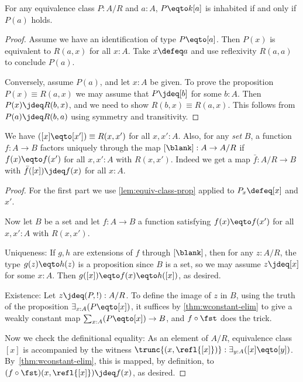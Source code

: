 \begin{lemma}\label{lem:equiv-class-prop}
  For any equivalence class $P : A/R$ and $a:A$,
  $P \eqto k[a]$ is inhabited if and only if $P(a)$ holds.
\end{lemma}
\begin{proof}
  Assume we have an identification of type $P \eqto [a]$. Then $P(x)$ is equivalent to $R(a,x)$ for all $x:A$.
  Take $x\defeq a$ and use reflexivity $R(a,a)$ to conclude $P(a)$.

  Conversely, assume $P(a)$, and let $x:A$ be given.
  To prove the proposition $P(x) \equiv R(a,x)$ we may assume that
  $P \jdeq [b]$ for some $b:A$.
  Then $P(x) \jdeq R(b,x)$, and we need to show $R(b,x) \equiv R(a,x)$.
  This follows from $P(a) \jdeq R(b,a)$ using symmetry and transitivity.
\end{proof}
\begin{theorem}\label{thm:quotient-property}
  We have $([x] \eqto [x']) \equiv R(x,x')$ for all $x,x':A$.
  Also, for any \emph{set} $B$, a
  function $f : A \to B$ factors uniquely through the map $[\blank] : A \to A/R$ if
  $f(x) \eqto f(x')$ for all $x,x':A$ with $R(x,x')$.
  Indeed we get a map $\bar f : A/R \to B$ with
  $\bar f([x]) \jdeq f(x)$ for all $x:A$.
\end{theorem}
\begin{proof}
  For the first part we use \cref{lem:equiv-class-prop} applied to $P_x \defeq [x]$ and $x'$.

  Now let $B$ be a set and let $f : A \to B$ a function satisfying $f(x) \eqto f(x')$
  for all $x,x':A$ with $R(x,x')$.

  Uniqueness: If $g,h$ are extensions of $f$ through $[\blank]$, then
  for any $z:A/R$, the type $g(z) \eqto h(z)$ is a proposition since $B$ is
  a set, so we may assume $z\jdeq [x]$ for some $x:A$. Then
  $g([x]) \eqto f(x) \eqto h([x])$, as desired.

  Existence: Let $z\jdeq(P,!):A/R$. To define the image of $z$ in $B$,
  using the truth of the proposition $\exists_{x:A}(P \eqto [x])$,
  it suffices by \cref{thm:wconstant-elim}
  to give a weakly constant map $\sum_{x:A}(P \eqto [x]) \to B$,
  and $f \circ \fst$ does the trick.

  Now we check the definitional equality: As an element of $A/R$,
  equivalence class $[x]$ is accompanied by the witness
  $\trunc{(x, \refl{[x]})} : \exists_{y:A}([x] \eqto [y])$.
  By~\cref{thm:wconstant-elim}, this is mapped, by definition,
  to $(f \circ \fst)(x, \refl{[x]}) \jdeq f(x)$, as desired.
\end{proof}


